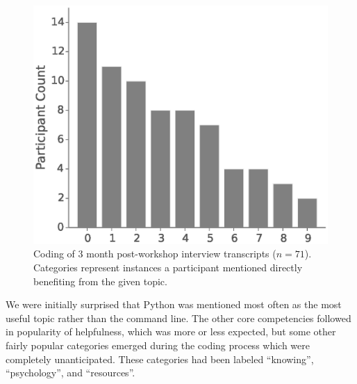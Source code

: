 \documentclass[10pt, twocolumn]{article}
\begin{document}
\begin{figure}
\centering
\includegraphics[width=\linewidth]{InterviewResponses}
\caption{
    Coding of 3 month post-workshop interview transcripts ($n=71$).
    Categories represent instances a participant mentioned
    directly benefiting from the given topic.
}
\label{InterviewResponses}
\end{figure}

We were initially surprised that Python was mentioned most often as the most useful topic rather than the command line.
The other core competencies followed in popularity of helpfulness,
which was more or less expected,
but some other fairly popular categories emerged during the coding process which were completely unanticipated.
These categories had been labeled ``knowing'', ``psychology'', and ``resources''.
\end{document}
